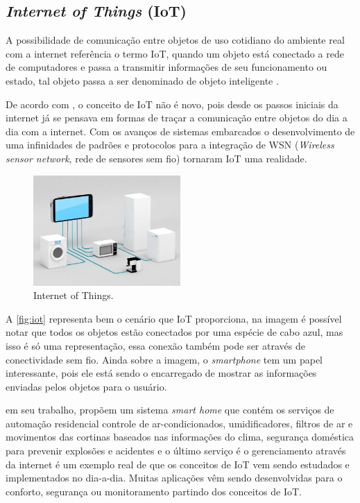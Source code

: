     \subsection{\textit{Internet of Things }(IoT)}
    \par
    A possibilidade de comunicação entre objetos de uso cotidiano do ambiente real com a internet referência o termo IoT, quando um objeto está conectado a rede de computadores e passa a transmitir informações de seu funcionamento ou estado, tal objeto passa a ser denominado de objeto inteligente \cite{iot2016}.
    \par
    De acordo com , o conceito de IoT não é novo, pois desde os passos iniciais da internet já se
    pensava em formas de traçar a comunicação entre objetos do dia a dia com a internet. Com os avanços de sistemas embarcados o
    desenvolvimento de uma infinidades de padrões e protocolos para a integração de
    WSN (\textit{Wireless sensor network}, rede de sensores sem fio) tornaram IoT uma realidade.
    \begin{figure}[H]
              \caption{\label{fig:iot}{Internet of Things.}}
              \centering
              \includegraphics[width=0.5\textwidth]{Figuras/iot.png}
        \end{figure}
    \par

    A \autoref{fig:iot} representa bem o cenário que IoT proporciona, na imagem é possível notar que todos os objetos estão conectados por
    uma espécie de cabo azul, mas isso é só uma representação, essa conexão também pode ser através de conectividade sem fio. Ainda
    sobre a imagem, o \textit{smartphone} tem um papel interessante, pois ele está sendo o encarregado de mostrar as informações enviadas
    pelos objetos para o usuário.

     em seu trabalho, propõem um sistema \textit{smart home} que contém os serviços de automação residencial controle de ar-condicionados, umidificadores, filtros de ar e movimentos das cortinas baseados nas informações do clima, segurança doméstica para prevenir explosões e acidentes e o último serviço é o gerenciamento através da internet é um exemplo real de que os conceitos de IoT vem sendo estudados e implementados no dia-a-dia. Muitas aplicações vêm sendo desenvolvidas para o conforto, segurança ou monitoramento partindo dos conceitos de IoT.
    
